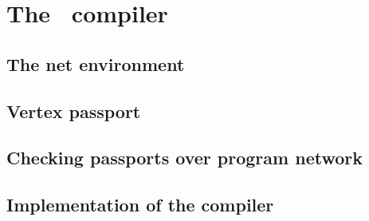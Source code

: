 \chapter{The \ak\ compiler}
  \section{The net environment}
  \section{Vertex passport}
  \section{Checking passports over program network}
  \section{Implementation of the compiler}
